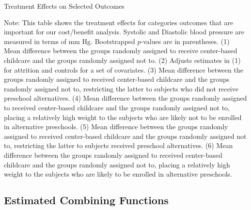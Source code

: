 \begin{table}[!htbp]
\centering
\begin{threeparttable}
\caption{Treatment Effects on Selected Outcomes}\label{table:tescombined}
\begin{scriptsize}

\end{scriptsize}
\begin{tablenotes}
\tiny
\item Note: This table shows the treatment effects for categories outcomes that are important for our cost/benefit analysis. Systolic and Diastolic blood pressure are measured in terms of mm Hg. Bootstrapped $p$-values are in parentheses. (1) Mean difference between the groups randomly assigned to receive center-based childcare and the groups randomly assigned not to. (2) Adjusts estimates in (1) for attrition and controls for a set of covariates. (3) Mean difference between the groups randomly assigned to received center-based childcare and the groups randomly assigned not to, restricting the latter to subjects who did not receive preschool alternatives. (4) Mean difference between the groups randomly assigned to received center-based childcare and the groups randomly assigned not to, placing a relatively high weight to the subjects who are likely not to be enrolled in alternative preschools. (5) Mean difference between the groups randomly assigned to received center-based childcare and the groups randomly assigned not to, restricting the latter to subjects received preschool alternatives. (6) Mean difference between the groups randomly assigned to received center-based childcare and the groups randomly assigned not to, placing a relatively high weight to the subjects who are likely to be enrolled in alternative preschools.
\end{tablenotes}
\end{threeparttable}
\end{table}
\restoregeometry
\doublespacing

\subsection{Estimated Combining Functions}


